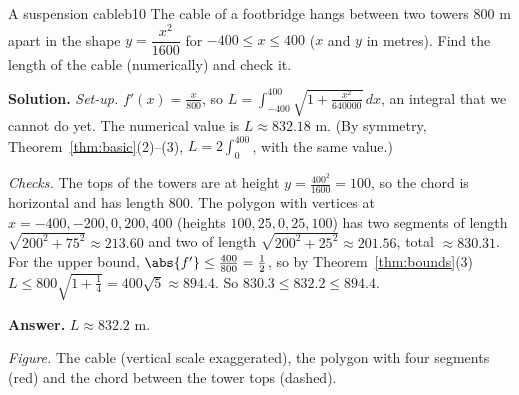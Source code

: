 \documentclass[11pt]{article}
\begin{document}
\begin{exmp}{A suspension cable}{b10}
The cable of a footbridge hangs between two towers $800$ m apart in the shape $y=\dfrac{x^2}{1600}$ for $-400\le x\le400$ ($x$ and $y$ in metres). Find the length of the cable (numerically) and check it.

\textbf{Solution.} \emph{Set-up.} $f'(x)=\frac x{800}$, so $L=\int_{-400}^{400}\sqrt{1+\frac{x^2}{640000}}\,dx$, an integral that we cannot do yet. The numerical value is $L\approx832.18$ m. (By symmetry, Theorem~\ref{thm:basic}(2)--(3), $L=2\int_0^{400}$, with the same value.)

\emph{Checks.} The tops of the towers are at height $y=\frac{400^2}{1600}=100$, so the chord is horizontal and has length $800$. The polygon with vertices at $x=-400,-200,0,200,400$ (heights $100,25,0,25,100$) has two segments of length $\sqrt{200^2+75^2}\approx213.60$ and two of length $\sqrt{200^2+25^2}\approx201.56$, total $\approx830.31$. For the upper bound, $\abs{f'}\le\frac{400}{800}=\frac12$, so by Theorem~\ref{thm:bounds}(3) $L\le800\sqrt{1+\frac14}=400\sqrt5\approx894.4$. So $830.3\le832.2\le894.4$.

\textbf{Answer.} $L\approx832.2$ m.
\begin{center}
\par\small\emph{Figure.} The cable (vertical scale exaggerated), the polygon with four segments (red) and the chord between the tower tops (dashed).
\end{center}
\end{exmp}
\end{document}
